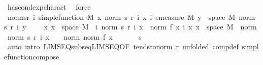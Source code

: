 \begin{isabellebody}
\ has{\isacharunderscore}{\kern0pt}cond{\isacharunderscore}{\kern0pt}exp{\isacharunderscore}{\kern0pt}charact{\isacharparenleft}{\kern0pt}{}{\isacharparenright}{\kern0pt}\ \isamarkupfalse%
\ force\isanewline
\isanewline
\ \ \isamarkupfalse%
\ norm{\isacharunderscore}{\kern0pt}s{\isacharunderscore}{\kern0pt}r{\isacharcolon}{\kern0pt}\ {\isachardoublequoteopen}{\isasymAnd}i{\isachardot}{\kern0pt}\ simple{\isacharunderscore}{\kern0pt}function\ M\ {\isacharparenleft}{\kern0pt}{\isasymlambda}x{\isachardot}{\kern0pt}\ norm\ {\isacharparenleft}{\kern0pt}s\ {\isacharparenleft}{\kern0pt}r\ i{\isacharparenright}{\kern0pt}\ x{\isacharparenright}{\kern0pt}{\isacharparenright}{\kern0pt}{\isachardoublequoteclose}\ {\isachardoublequoteopen}{\isasymAnd}i{\isachardot}{\kern0pt}\ emeasure\ M\ {\isacharbraceleft}{\kern0pt}y\ {\isasymin}\ space\ M{\isachardot}{\kern0pt}\ norm\ {\isacharparenleft}{\kern0pt}s\ {\isacharparenleft}{\kern0pt}r\ i{\isacharparenright}{\kern0pt}\ y{\isacharparenright}{\kern0pt}\ {\isasymnoteq}\ {}{\isacharbraceright}{\kern0pt}\ {\isasymnoteq}\ {\isasyminfinity}{\isachardoublequoteclose}\ {\isachardoublequoteopen}{\isasymAnd}x{\isachardot}{\kern0pt}\ x\ {\isasymin}\ space\ M\ {\isasymLongrightarrow}\ {\isacharparenleft}{\kern0pt}{\isasymlambda}i{\isachardot}{\kern0pt}\ norm\ {\isacharparenleft}{\kern0pt}s\ {\isacharparenleft}{\kern0pt}r\ i{\isacharparenright}{\kern0pt}\ x{\isacharparenright}{\kern0pt}{\isacharparenright}{\kern0pt}\ {\isasymlonglonglongrightarrow}\ norm\ {\isacharparenleft}{\kern0pt}f\ x{\isacharparenright}{\kern0pt}{\isachardoublequoteclose}\ {\isachardoublequoteopen}{\isasymAnd}i\ x{\isachardot}{\kern0pt}\ x\ {\isasymin}\ space\ M\ {\isasymLongrightarrow}\ norm\ {\isacharparenleft}{\kern0pt}norm\ {\isacharparenleft}{\kern0pt}s\ {\isacharparenleft}{\kern0pt}r\ i{\isacharparenright}{\kern0pt}\ x{\isacharparenright}{\kern0pt}{\isacharparenright}{\kern0pt}\ {\isasymle}\ {}\ {\isacharasterisk}{\kern0pt}\ norm\ {\isacharparenleft}{\kern0pt}norm\ {\isacharparenleft}{\kern0pt}f\ x{\isacharparenright}{\kern0pt}{\isacharparenright}{\kern0pt}{\isachardoublequoteclose}\ \isanewline
\ \ \ \ \isamarkupfalse%
\ s\ \isamarkupfalse%
\ {\isacharparenleft}{\kern0pt}auto\ intro{\isacharcolon}{\kern0pt}\ LIMSEQ{\isacharunderscore}{\kern0pt}subseq{\isacharunderscore}{\kern0pt}LIMSEQ{\isacharbrackleft}{\kern0pt}OF\ tendsto{\isacharunderscore}{\kern0pt}norm\ r{\isacharcomma}{\kern0pt}\ unfolded\ comp{\isacharunderscore}{\kern0pt}def{\isacharbrackright}{\kern0pt}\ simple{\isacharunderscore}{\kern0pt}function{\isacharunderscore}{\kern0pt}compose{}{\isacharparenright}{\kern0pt}\ \isanewline

\end{isabellebody}
